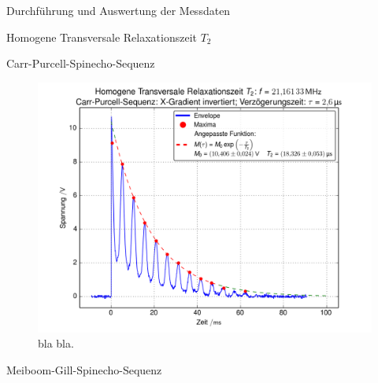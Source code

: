 \documentclass[pdftex, a4paper,11pt, twoside, ngerman]{report}
\begin{document}
\begin{chapter}{Durchführung und Auswertung der Messdaten}
\begin{section}{
        Homogene Transversale Relaxationszeit $T_{2}$}
\begin{subsection}{Carr-Purcell-Spinecho-Sequenz}
\begin{figure}[htb]
\begin{minipage}{.48\textwidth}
            \centering
            \includegraphics[width=\textwidth]
            {Figures/HomoTransRelax_Carr4.png}
            \caption{bla bla.}
            \label{figCarr4}
          \end{minipage}
        \end{figure}
        
        
      \end{subsection}
      
      
      \newpage
      \begin{subsection}{Meiboom-Gill-Spinecho-Sequenz}
        \label{chpHomoTransRelaxMG}
        
        
        

\end{subsection}
\end{section}
\end{chapter}
\end{document}
